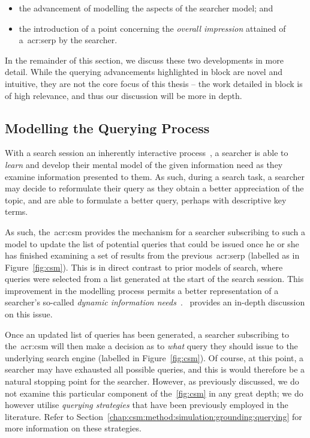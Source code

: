 \begin{itemize}
    \item[\blueboxbold{A}]{the advancement of modelling the  aspects of the searcher model; and}
    \item[\blueboxbold{B}]{the introduction of a  point concerning the \emph{overall impression} attained of a~\gls{acr:serp} by the searcher.}
\end{itemize}

In the remainder of this section, we discuss these two developments in more detail. While the querying advancements highlighted in block  are novel and intuitive, they are not the core focus of this thesis -- the work detailed in block  is of high relevance, and thus our discussion will be more in depth.

\subsection{Modelling the Querying Process}
With a search session an inherently interactive process~\citep{ingwersen2005theturn}, a searcher is able to \emph{learn} and develop their mental model of the given information need as they examine information presented to them. As such, during a search task, a searcher may decide to reformulate their query as they obtain a better appreciation of the topic, and are able to formulate a better query, perhaps with descriptive key terms.

As such, the~\gls{acr:csm} provides the mechanism for a searcher subscribing to such a model to update the list of potential queries that could be issued once he or she has finished examining a set of results from the previous~\gls{acr:serp} (labelled as  in Figure~\ref{fig:csm}). This is in direct contrast to prior models of search, where queries were selected from a list generated at the start of the search session. This improvement in the modelling process permits a better representation of a searcher's so-called \emph{dynamic information needs}~\citep{borlund2003iir_model}.~\cite{maxwell2016agents} provides an in-depth discussion on this issue.

Once an updated list of queries has been generated, a searcher subscribing to the~\gls{acr:csm} will then make a decision as to \emph{what} query they should issue to the underlying search engine (labelled  in Figure~\ref{fig:csm}). Of course, at this point, a searcher may have exhausted all possible queries, and this is would therefore be a natural stopping point for the searcher. However, as previously discussed, we do not examine this particular component of the~\ref{fig:csm} in any great depth; we do however utilise \emph{querying strategies} that have been previously employed in the literature. Refer to Section~\ref{chap:csm:method:simulation:grounding:querying} for more information on these strategies.

